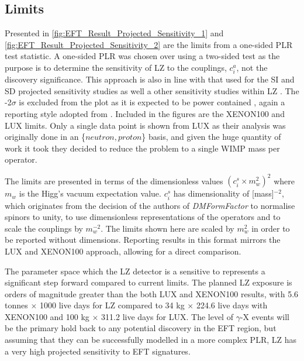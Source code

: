 \subsection{Limits}
\par
Presented in \autoref{fig:EFT_Result_Projected_Sensitivity_1} and \autoref{fig:EFT_Result_Projected_Sensitivity_2} are the limits from a one-sided PLR test statistic.
A one-sided PLR was chosen over using a two-sided test as the purpose is to determine the sensitivity of LZ to the couplings, $c^{a}_i$, not the discovery significance. 
This approach is also in line with that used for the SI and SD projected sensitivity studies \cite{LZ_projected_sensitivity_paper_ref} as well a other sensitivity studies within LZ \cite{LZ_Ibles_LZStats_Thesis_ref, umituktu_thesis_ref}.
The -2$\sigma$ is excluded from the plot as it is expected to be power contained \cite{power_constrained_limits_ref}, again a reporting style adopted from \cite{LZ_projected_sensitivity_paper_ref}.
Included in the figures are the XENON100 \cite{xenon100_eft_ref} and LUX \cite{LUX_RUN4_EFT_2021} limits.
Only a single data point is shown from LUX as their analysis was originally done in an \{$neutron,proton$\} basis, and given the huge quantity of work it took they decided to reduce the problem to a single WIMP mass per operator.
\par
The limits are presented in terms of the dimensionless values $({c}^{s}_{i}\times{m}^{2}_{w})^{2}$ where $m_w$ is the Higg's vacuum expectation value.
${c}^{s}_{i}$ has dimensionality of [mass]$^{-2}$, which originates from the decision of the authors of \textit{DMFormFactor} to normalise spinors to unity, to use dimensionless representations of the operators and to scale the couplings by $m^{-2}_w$.
The limits shown here are scaled by $m^2_w$ in order to be reported without dimensions.
Reporting results in this format mirrors the LUX and XENON100 approach, allowing for a direct comparison.
\par
The parameter space which the LZ detector is a sensitive to represents a significant step forward compared to current limits.
The planned LZ exposure is orders of magnitude greater than the both LUX and XENON100 results, with 5.6 tonnes $\times$ 1000 live days for LZ compared to 34 kg $\times$ 224.6 live days with XENON100 and 100 kg $\times$ 311.2 live days for LUX.
The level of $\gamma$-X events will be the primary hold back to any potential discovery in the EFT region, but assuming that they can be successfully modelled in a more complex PLR, LZ has a very high projected sensitivity to EFT signatures.

